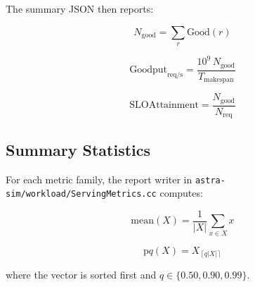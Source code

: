 The summary JSON then reports:

\begin{equation*}
N_{\mathrm{good}} = \sum_r \mathrm{Good}(r)
\end{equation*}

\begin{equation*}
\mathrm{Goodput}_{\mathrm{req/s}} =
\frac{10^9 \, N_{\mathrm{good}}}{T_{\mathrm{makespan}}}
\end{equation*}

\begin{equation*}
\mathrm{SLOAttainment} =
\frac{N_{\mathrm{good}}}{N_{\mathrm{req}}}
\end{equation*}

\subsection{Summary Statistics}

For each metric family, the report writer in
\texttt{astra-sim/workload/ServingMetrics.cc} computes:

\begin{equation*}
\mathrm{mean}(X) = \frac{1}{|X|} \sum_{x \in X} x
\end{equation*}

\begin{equation*}
\mathrm{p}q(X) = X_{\left\lceil q |X| \right\rceil}
\end{equation*}

where the vector is sorted first and \(q \in \{0.50, 0.90, 0.99\}\).
